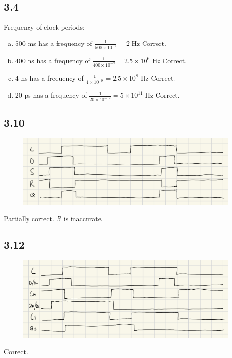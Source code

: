 \documentclass{article}
\begin{document}
\subsection*{3.4}
Frequency of clock periods:
\begin{enumerate}[(a)]
    \item 500 ms has a frequency of $\frac{1}{500 \times 10^{-3}} = 2$ Hz \textcolor{mygreen}{Correct.}
    \item 400 ns has a frequency of $\frac{1}{400 \times 10^{-9}} = 2.5 \times 10^6$ Hz \textcolor{mygreen}{Correct.}
    \item 4 ns has a frequency of $\frac{1}{4 \times 10^{-9}} = 2.5 \times 10^8$ Hz \textcolor{mygreen}{Correct.}
    \item 20 ps has a frequency of $\frac{1}{20 \times 10^{-12}} = 5 \times 10^{11}$ Hz \textcolor{mygreen}{Correct.}
\end{enumerate}

\subsection*{3.10}
\begin{figure}[H]
    \centering
    \includegraphics[width=\textwidth]{./images/3_10.jpg}
\end{figure}
\textcolor{myorange}{Partially correct. $R$ is inaccurate.}

\subsection*{3.12}
\begin{figure}[H]
    \centering
    \includegraphics[width=\textwidth]{./images/3_12.jpg}
\end{figure}
\textcolor{mygreen}{Correct.}
\end{document}
